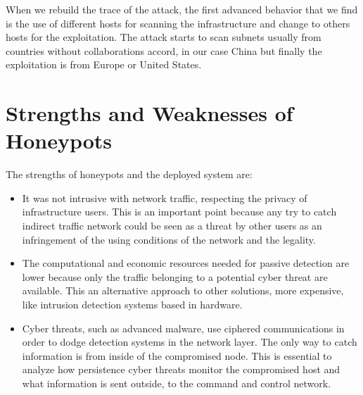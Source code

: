 \documentclass[a4paper]{llncs}
\begin{document}
When we rebuild the trace of the attack, the first advanced behavior that we find is the use of different hosts for scanning the infrastructure and change to others hosts for the exploitation. The attack starts to scan subnets usually from countries without collaborations accord, in our case China but finally the exploitation is from Europe or United States.

\section{Strengths and Weaknesses of Honeypots}
\label{sec:Strengths&Weaknesses}
The strengths of honeypots and the deployed system are:
\begin{itemize}
	\item It was not intrusive with network traffic, respecting the privacy of infrastructure users. This is an important point because any try to catch indirect traffic network could be seen as a threat by other users as an infringement of the using conditions of the network and the legality.
	\item The computational and economic resources needed for passive detection are lower because only the traffic belonging to a potential cyber threat are available. This an alternative approach to other solutions, more expensive, like intrusion detection systems based in hardware.
	\item Cyber threats, such as advanced malware, use ciphered communications in order to dodge detection systems in the network layer. The only way to catch information is from inside of the compromised node. This is essential to analyze how persistence cyber threats monitor the compromised host and what information is sent outside, to the command and control network.
\end{itemize}
\end{document}

